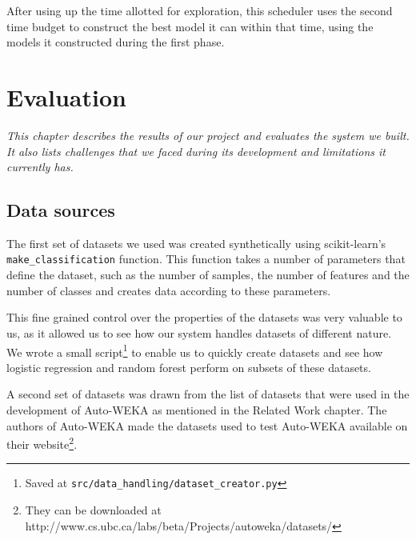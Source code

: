 \documentclass[a4paper,12pt,twoside,openright]{report}
\begin{document}
After using up the time allotted for exploration, this scheduler uses the second time budget to construct the best model it can within that time, using the models it constructed during the first phase.


\chapter{Evaluation}
\textit{This chapter describes the results of our project and evaluates the system we built. It also lists challenges that we faced during its development and limitations it currently has.}




 




\section{Data sources}


The first set of datasets we used was created synthetically using scikit-learn's \texttt{make\_classification} function. This function takes a number of parameters that define the dataset, such as the number of samples, the number of features and the number of classes and creates data according to these parameters. 

This fine grained control over the properties of the datasets was very valuable to us, as it allowed us to see how our system handles datasets of different nature. We wrote a small script\footnote{Saved at \texttt{src/data\_handling/dataset\_creator.py}} to enable us to quickly create datasets and see how logistic regression and random forest perform on subsets of these datasets.



A second set of datasets was drawn from the list of datasets that were used in the development of Auto-WEKA as mentioned in the Related Work chapter. The authors of Auto-WEKA made the datasets used to test Auto-WEKA available on their website\footnote{They can be downloaded at http://www.cs.ubc.ca/labs/beta/Projects/autoweka/datasets/}.
\end{document}
